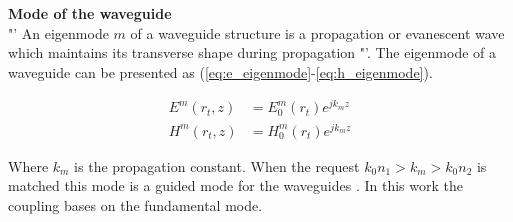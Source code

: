 \textbf{Mode of the waveguide}\\

"' An eigenmode $m$ of a waveguide structure is a propagation or evanescent wave which maintains its transverse shape during propagation "'\cite{integrated_optics}. The eigenmode of a waveguide can be presented as (\ref{eq:e_eigenmode}-\ref{eq:h_eigenmode}). 

\begin{align}
E^{m}(r_{t},z)&=E^{m}_{0}(r_{t})e^{jk_{m}z}
\label{eq:e_eigenmode}\\
H^{m}(r_{t},z)&=H^{m}_{0}(r_{t})e^{jk_{m}z}
\label{eq:h_eigenmode}
\end{align}

Where $k_{m}$ is the propagation constant. When the request  $k_{0}n_{1}>k_{m}>k_{0}n_{2}$ is matched this mode is a guided mode for the waveguides \cite{script_FT_TET}. In this work the coupling bases on the fundamental mode.

